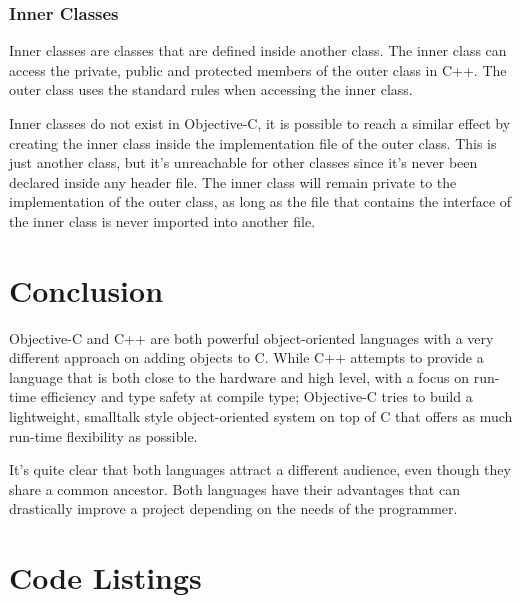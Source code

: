 \documentclass[12pt, a4paper, twocolumn]{article}
\begin{document}
\subsubsection{Inner Classes}
\label{sec:inner}

Inner classes are classes that are defined inside another class. The inner class can access the private, public and protected members of the outer class in C++. The outer class uses the standard rules when accessing the inner class.

Inner classes do not exist in Objective-C, it is possible to reach a similar effect by creating the inner class inside the implementation file of the outer class. This is just another class, but it's unreachable for other classes since it's never been declared inside any header file. The inner class will remain private to the implementation of the outer class, as long as the file that contains the interface of the inner class is never imported into another file.

\section{Conclusion}
Objective-C and C++ are both powerful object-oriented languages with a very different approach on adding objects to C. While C++ attempts to provide a language that is both close to the hardware and high level, with a focus on run-time efficiency and type safety at compile type; Objective-C tries to build a lightweight, smalltalk style object-oriented system on top of C that offers as much run-time flexibility as possible.

It's quite clear that both languages attract a different audience, even though they share a common ancestor. Both languages have their advantages that can drastically improve a project depending on the needs of the programmer.

\printbibliography[heading = bibnumbered]

\section{Code Listings}

\end{document}

